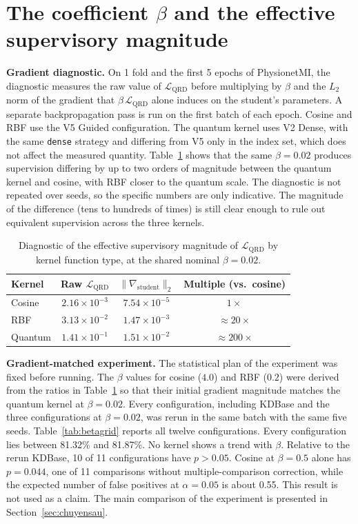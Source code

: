 \section{The coefficient $\beta$ and the effective supervisory magnitude}
\label{app:kiemsoat}

\textbf{Gradient diagnostic.} On 1 fold and the first 5 epochs of PhysionetMI, the diagnostic measures
the raw value of $\mathcal{L}_{\mathrm{QRD}}$ before multiplying by $\beta$
and the $L_2$ norm of the gradient that $\beta\,\mathcal{L}_{\mathrm{QRD}}$
alone induces on the student's parameters. A separate backpropagation pass
is run on the first batch of each epoch. Cosine and RBF use the V5 Guided configuration. The quantum
kernel uses V2 Dense, with the same \texttt{dense} strategy and differing
from V5 only in the index set, which does not affect the measured
quantity. Table~\ref{tab:betafair} shows that the same $\beta = 0.02$
produces supervision differing by up to two orders of magnitude between
the quantum kernel and cosine, with RBF closer to the quantum scale. The
diagnostic is not repeated over seeds, so the specific numbers are only
indicative. The magnitude of the difference (tens to hundreds of times)
is still clear enough to rule out equivalent supervision across the
three kernels.

\begin{table}[!htbp]
\centering
\caption{Diagnostic of the effective supervisory magnitude of
$\mathcal{L}_{\mathrm{QRD}}$ by kernel function type, at the shared
nominal $\beta = 0.02$.}
\label{tab:betafair}
\begin{tabular}{lccc}
\toprule
\textbf{Kernel} & \textbf{Raw} $\mathcal{L}_{\mathrm{QRD}}$ & $\|\nabla_{\mathrm{student}}\|_2$ & \textbf{Multiple (vs.\ cosine)} \\
\midrule
Cosine  & $2.16 \times 10^{-3}$ & $7.54 \times 10^{-5}$ & $1\times$ \\
RBF     & $3.13 \times 10^{-2}$ & $1.47 \times 10^{-3}$ & $\approx 20\times$ \\
Quantum & $1.41 \times 10^{-1}$ & $1.51 \times 10^{-2}$ & $\approx 200\times$ \\
\bottomrule
\end{tabular}
\end{table}
\FloatBarrier

\textbf{Gradient-matched experiment.} The statistical plan of the
experiment was fixed before running. The $\beta$ values for cosine
($4.0$) and RBF ($0.2$) were derived from the ratios in
Table~\ref{tab:betafair} so that their initial gradient magnitude matches
the quantum kernel at $\beta = 0.02$. Every configuration, including
KDBase and the three configurations at $\beta = 0.02$, was rerun in the
same batch with the same five seeds. Table~\ref{tab:betagrid} reports all
twelve configurations. Every configuration lies between 81.32\% and
81.87\%. No kernel shows a trend with $\beta$. Relative to the rerun
KDBase, 10 of 11 configurations have $p > 0.05$. Cosine at $\beta = 0.5$
alone has $p = 0.044$, one of 11 comparisons without multiple-comparison
correction, while the expected number of false positives at
$\alpha = 0.05$ is about 0.55. This result is not used as a claim. The
main comparison of the experiment is presented in
Section~\ref{sec:chuyensau}.

